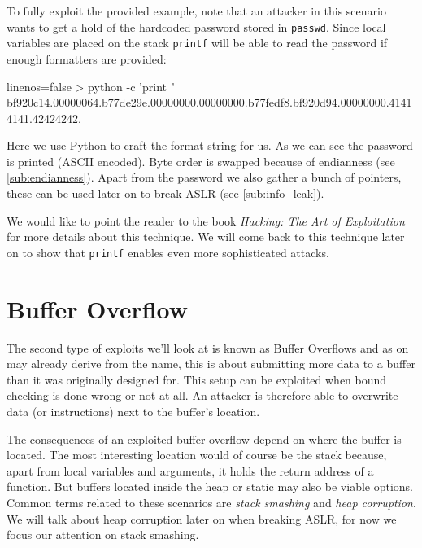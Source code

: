 \documentclass[article]{uibk}
\begin{document}
To fully exploit the provided example, note that an attacker in this scenario
wants to get a hold of the hardcoded password stored in \texttt{passwd}. Since
local variables are placed on the stack \texttt{printf} will be able to read
the password if enough formatters are provided:

\begin{code*}{linenos=false}
    > python -c 'print "%
    bf920c14.00000064.b77de29e.00000000.00000000.b77fedf8.bf920d94.00000000.41414141.42424242.
\end{code*}

Here we use Python to craft the format string for us. As we can see the
password is printed (ASCII encoded). Byte order is swapped because of
endianness (see \cref{sub:endianness}). Apart from the password we also gather
a bunch of pointers, these can be used later on to break ASLR (see
\cref{sub:info_leak}).

We would like to point the reader to the book \textit{Hacking: The Art of
Exploitation} \cite[pp.~167]{art_of_exploitation} for more details about this
technique. We will come back to this technique later on to show that
\texttt{printf} enables even more sophisticated attacks.

\section{Buffer Overflow}

The second type of exploits we'll look at is known as Buffer Overflows and as
on may already derive from the name, this is about submitting more data to a
buffer than it was originally designed for. This setup can be exploited when
bound checking is done wrong or not at all. An attacker is therefore able to
overwrite data (or instructions) next to the buffer's location.

The consequences of an exploited buffer overflow depend on where the buffer is
located. The most interesting location would of course be the stack because,
apart from local variables and arguments, it holds the return address of a
function. But buffers located inside the heap or static may also be viable
options. Common terms related to these scenarios are \textit{stack smashing}
and \textit{heap corruption}. We will talk about heap corruption later on when
breaking ASLR, for now we focus our attention on stack smashing.
\end{document}
